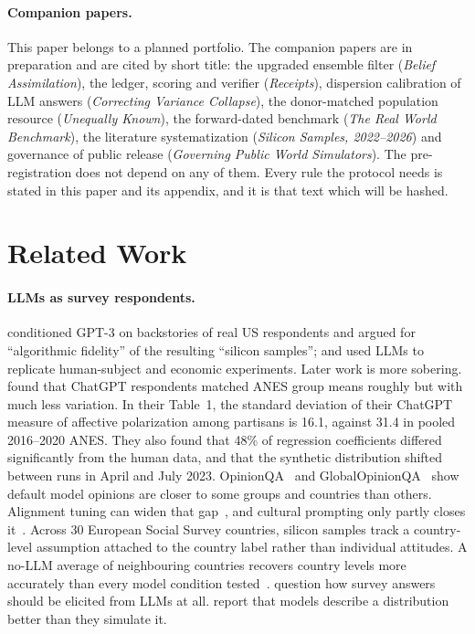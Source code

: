 \documentclass[11pt]{article}
\begin{document}
\paragraph{Companion papers.} This paper belongs to a planned portfolio. The companion papers are in preparation and are cited by short title: the upgraded ensemble filter (\emph{Belief Assimilation}), the ledger, scoring and verifier (\emph{Receipts}), dispersion calibration of LLM answers (\emph{Correcting Variance Collapse}), the donor-matched population resource (\emph{Unequally Known}), the forward-dated benchmark (\emph{The Real World Benchmark}), the literature systematization (\emph{Silicon Samples, 2022--2026}) and governance of public release (\emph{Governing Public World Simulators}). The pre-registration does not depend on any of them. Every rule the protocol needs is stated in this paper and its appendix, and it is that text which will be hashed.

\section{Related Work}\label{sec:related}

\paragraph{LLMs as survey respondents.} \citet{argyle2023outofone} conditioned GPT-3 on backstories of real US respondents and argued for ``algorithmic fidelity'' of the resulting ``silicon samples''; \citet{aher2023simulate} and \citet{horton2023homo} used LLMs to replicate human-subject and economic experiments. Later work is more sobering. \citet{bisbee2024synthetic} found that ChatGPT respondents matched ANES group means roughly but with much less variation. In their Table~1, the standard deviation of their ChatGPT measure of affective polarization among partisans is 16.1, against 31.4 in pooled 2016--2020 ANES. They also found that 48\% of regression coefficients differed significantly from the human data, and that the synthetic distribution shifted between runs in April and July 2023. OpinionQA~\citep{santurkar2023whose} and GlobalOpinionQA~\citep{durmus2023global} show default model opinions are closer to some groups and countries than others. Alignment tuning can widen that gap~\citep{ryan2024unintended}, and cultural prompting only partly closes it~\citep{tao2024cultural}. Across 30 European Social Survey countries, silicon samples track a country-level assumption attached to the country label rather than individual attitudes. A no-LLM average of neighbouring countries recovers country levels more accurately than every model condition tested~\citep{wang2026silicon}. \citet{dominguez2023questioning} question how survey answers should be elicited from LLMs at all. \citet{meister2024distributional} report that models describe a distribution better than they simulate it.
\end{document}
